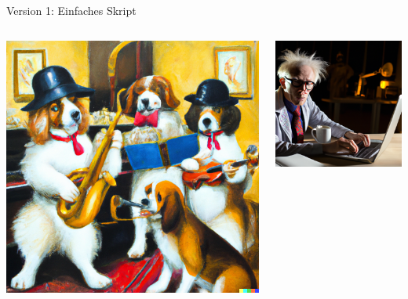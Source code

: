 {\begin{frame}{Version 1: Einfaches Skript}
\begin{columns}
        \includegraphics[width=\textwidth]{img/ipaint-generiert4}

        \includegraphics[width=\textwidth]{img/ipaint-generiert5}
    \end{columns}
\end{frame}

}
